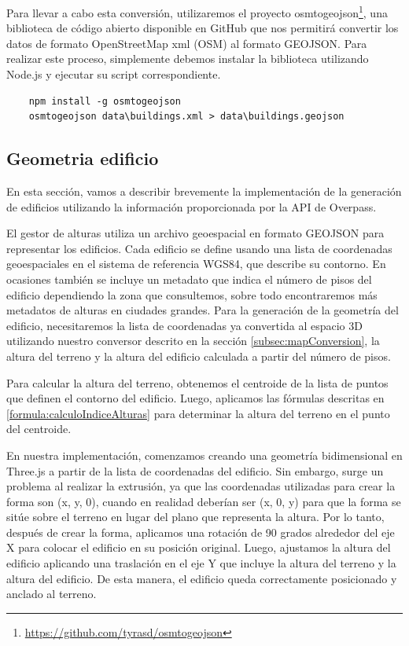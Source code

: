 \documentclass[a4paper, 11pt]{book}
\begin{document}
Para llevar a cabo esta conversión, utilizaremos el proyecto osmtogeojson\footnote{\url{https://github.com/tyrasd/osmtogeojson}}, una biblioteca de código abierto disponible en GitHub que nos permitirá convertir los datos de formato OpenStreetMap xml (OSM) al formato GEOJSON. Para realizar este proceso, simplemente debemos instalar la biblioteca utilizando Node.js y ejecutar su script correspondiente.
\label{manual:osmtogeojson}
{\scriptsize
    \begin{verbatim}
    npm install -g osmtogeojson
    osmtogeojson data\buildings.xml > data\buildings.geojson
    \end{verbatim}
}

\subsection{Geometria edificio}
\label{subsec:buildingGeometry}
En esta sección, vamos a describir brevemente la implementación de la generación de edificios utilizando la información proporcionada por la API de Overpass.

El gestor de alturas utiliza un archivo geoespacial en formato GEOJSON para representar los edificios. Cada edificio se define usando una lista de coordenadas geoespaciales en el sistema de referencia WGS84, que describe su contorno. En ocasiones también se incluye un metadato que indica el número de pisos del edificio dependiendo la zona que consultemos, sobre todo encontraremos más metadatos de alturas en ciudades grandes. 
Para la generación de la geometría del edificio, necesitaremos la lista de coordenadas ya convertida al espacio 3D utilizando nuestro conversor descrito en la sección \ref{subsec:mapConversion}, la altura del terreno y la altura del edificio calculada a partir del número de pisos.

Para calcular la altura del terreno, obtenemos el centroide de la lista de puntos que definen el contorno del edificio. Luego, aplicamos las fórmulas descritas en \ref{formula:calculoIndiceAlturas} para determinar la altura del terreno en el punto del centroide.

En nuestra implementación, comenzamos creando una geometría bidimensional en Three.js a partir de la lista de coordenadas del edificio. Sin embargo, surge un problema al realizar la extrusión, ya que las coordenadas utilizadas para crear la forma son (x, y, 0), cuando en realidad deberían ser (x, 0, y) para que la forma se sitúe sobre el terreno en lugar del plano que representa la altura. Por lo tanto, después de crear la forma, aplicamos una rotación de 90 grados alrededor del eje X para colocar el edificio en su posición original. Luego, ajustamos la altura del edificio aplicando una traslación en el eje Y que incluye la altura del terreno y la altura del edificio. De esta manera, el edificio queda correctamente posicionado y anclado al terreno.
\end{document}

